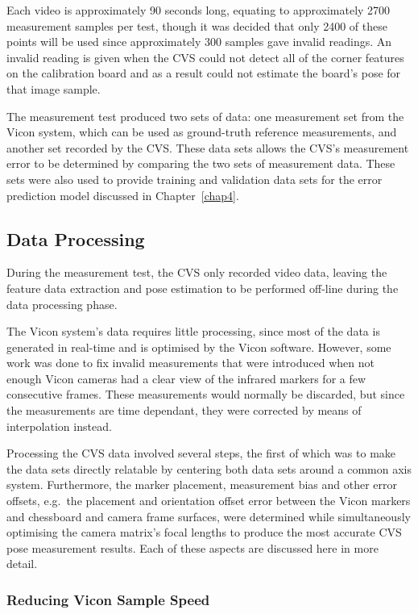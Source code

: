 Each video is approximately 90 seconds long, equating to approximately 2700 measurement samples per test, though it was decided that only 2400 of these points will be used since approximately 300 samples gave invalid readings. An invalid reading is given when the CVS could not detect all of the corner features on the calibration board and as a result could not estimate the board's pose for that image sample.  

The measurement test produced two sets of data: one measurement set from the Vicon system, which can be used as ground-truth reference measurements, and another set recorded by the CVS\@. These data sets allows the CVS's measurement error to be determined by comparing the two sets of measurement data. These sets were also used to provide training and validation data sets for the error prediction model discussed in Chapter~\ref{chap4}. 

\subsection{Data Processing}

During the measurement test, the CVS only recorded video data, leaving the feature data extraction and pose estimation to be performed off-line during the data processing phase. 

The Vicon system's data requires little processing, since most of the data is generated in real-time and is optimised by the Vicon software. However, some work was done to fix invalid measurements that were introduced when not enough Vicon cameras had a clear view of the infrared markers for a few consecutive frames. These measurements would normally be discarded, but since the measurements are time dependant, they were corrected by means of interpolation instead.

Processing the CVS data involved several steps, the first of which was to make the data sets directly relatable by centering both data sets around a common axis system. Furthermore, the marker placement, measurement bias and other error offsets, e.g.\ the placement and orientation offset error between the Vicon markers and chessboard and camera frame surfaces, were determined while simultaneously optimising the camera matrix's focal lengths to produce the most accurate CVS pose measurement results. Each of these aspects are discussed here in more detail.

\subsubsection{Reducing Vicon Sample Speed}

